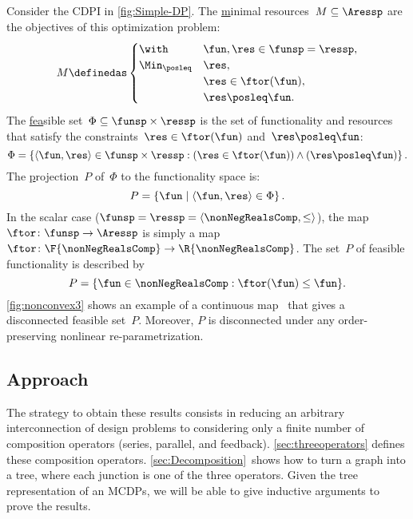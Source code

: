 \begin{example}
  \label{exa:one}
  Consider the CDPI in \cref{fig:Simple-DP}. The \uline{m}inimal resources~$M\subseteq\Aressp$ are the objectives of this optimization problem:
  \[
    M\definedas\begin{cases}
                 \with & \fun,\res\in\funsp=\ressp,\\
                 \Min_{\posleq} & \res,\\
                 & \res\in\ftor(\fun),\\
                 & \res\posleq\fun.
    \end{cases}
  \]
  The \uline{fea}sible set~$\Phi\subseteq\funsp\times\ressp$ is
  the set of functionality and resources that satisfy the constraints~$\res\in\ftor(\fun)$
  and~$\res\posleq\fun$:
  \begin{equation}
    \Phi=\left\{ \langle\fun,\res\rangle\in\funsp\times\ressp:(\res\in\ftor(\fun))\wedge(\res\posleq\fun)\right\} .\label{eq:feasible}
  \end{equation}
  The \uline{p}rojection~$P$ of~$\Phi$ to the functionality space
  is:
  \[
    P=\left\{ \fun\mid\left\langle \fun,\res\right\rangle \in\Phi\right\}.
  \]
  In the scalar case ($\funsp=\ressp=\langle\nonNegRealsComp,\leq\rangle$),
  the map~$\ftor\colon\funsp\rightarrow\Aressp$ is simply a map~$\ftor\colon\F{\nonNegRealsComp}\rightarrow\R{\nonNegRealsComp}$.
  The set~$P$ of feasible functionality is described by
  \begin{equation}
    P=\{\fun\in\nonNegRealsComp:\ftor(\fun)\leq\fun\}.\label{eq:Pfeasible}
  \end{equation}
  \cref{fig:nonconvex3} shows an example of a continuous map~\ftor
  that gives a disconnected feasible set~$P$. Moreover, $P$ is disconnected
  under any order-preserving nonlinear re-parametrization.

\end{example}

\subsection{Approach}

The strategy to obtain these results consists in reducing an arbitrary
interconnection of design problems to considering only a finite
number of composition operators (series, parallel, and feedback).
\cref{sec:threeoperators} defines these composition operators. \cref{sec:Decomposition}~shows
how to turn a graph into a tree, where each junction is one of the
three operators. Given the tree representation of an MCDPs, we will
be able to give inductive arguments to prove the results.


